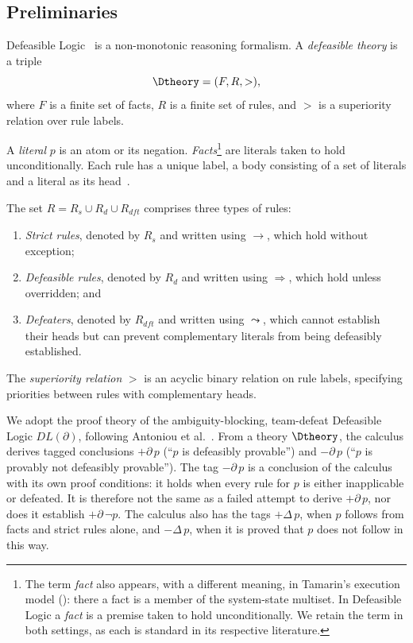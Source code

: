\subsection{Preliminaries}
\label{Subsec:DefeasibleLogic}

Defeasible Logic~\cite{nute1994defeasible} is a non-monotonic reasoning formalism. A \emph{defeasible theory} is a triple 
\[
  \Dtheory=(F,R,>),
\]
where $F$ is a finite set of facts, $R$ is a finite set of rules, and $>$ is a superiority relation over rule labels. 

A \emph{literal} $p$ is an atom or its negation.
\emph{Facts}\footnote{The term \emph{fact} also appears, with a different meaning, in Tamarin's execution model (): there a fact is a member of the system-state multiset. In Defeasible Logic a \emph{fact} is a premise taken to hold unconditionally. We retain the term in both settings, as each is standard in its respective literature.} are literals taken to hold unconditionally.
Each rule has a unique label, a body consisting of a set of literals and a literal as its head~\cite{governatori2017annotated}.

The set $R = R_s\mathbin{\cup}R_d\mathbin{\cup}R_{\mathit{dft}}$ comprises three types of rules:
\begin{enumerate}
    \item \emph{Strict rules}, denoted by $R_s$ and written using $\to$, which hold without exception; 
    \item \emph{Defeasible rules}, denoted by $R_d$ and written using $\Rightarrow$, which hold unless overridden; and
    \item \emph{Defeaters}, denoted by $R_{\mathit{dft}}$ and written using $\leadsto$, which cannot establish their heads but can prevent complementary literals from being defeasibly established. 
\end{enumerate}

The \emph{superiority relation} $>$ is an acyclic binary relation on rule labels, specifying priorities between rules with complementary heads. 

We adopt the proof theory of the ambiguity-blocking, team-defeat Defeasible Logic $DL(\partial)$, following Antoniou et al.~\cite{antoniou2001representation}. From a theory $\Dtheory$, the calculus derives tagged conclusions $+\partial\,p$ (``$p$ is defeasibly provable'') and $-\partial\,p$ (``$p$ is provably not defeasibly provable''). The tag $-\partial\,p$ is a conclusion of the calculus with its own proof conditions: it holds when every rule for $p$ is either inapplicable or defeated. It is therefore not the same as a failed attempt to derive $+\partial\,p$, nor does it establish $+\partial\,\neg p$. The calculus also has the tags $+\Delta\,p$, when $p$ follows from facts and strict rules alone, and $-\Delta\,p$, when it is proved that $p$ does not follow in this way.

